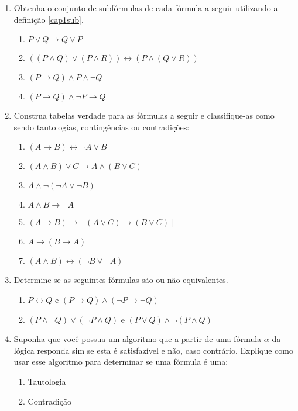 \begin{enumerate}
        \item Obtenha o conjunto de subf\'ormulas de cada f\'ormula a
          seguir utilizando a defini\c{c}\~ao \ref{cap1sub}.
        \begin{enumerate}
           \item $P\lor Q \rightarrow Q \lor P$
           \item $((P\land Q)\lor (P\land R))\leftrightarrow(P\land (Q\lor R))$
           \item $(P\rightarrow Q) \land P\land \neg Q$
           \item $(P \rightarrow Q)\land \neg P \rightarrow Q$
        \end{enumerate}
	\item Construa tabelas verdade para as f\'ormulas a seguir e
          classifique-as como sendo tautologias, conting\^encias ou contradi\c{c}\~oes:
	\begin{enumerate}
		\item $(A\rightarrow B)\leftrightarrow\neg A\lor B$
		\item $(A\land B)\lor C\rightarrow A\land(B\lor C)$
		\item $A\land\neg (\neg A\lor \neg B)$
		\item $A\land B\rightarrow\neg A$
		\item $(A\rightarrow B)\rightarrow[(A\lor C)\rightarrow (B\lor C)]$
		\item $A\rightarrow(B\rightarrow A)$
		\item $(A\land B)\leftrightarrow(\neg B\lor \neg A)$
	\end{enumerate}
        \item Determine se as seguintes f\'ormulas s\~ao ou n\~ao
          equivalentes.
         \begin{enumerate}
		\item $P\leftrightarrow Q$ e $(P\rightarrow Q)\land(\neg P\rightarrow \neg Q)$
		\item $(P\land\neg Q)\lor (\neg P\land Q)$ e $(P\lor Q)\land\neg(P\land Q)$
          \end{enumerate}
          \item Suponha que voc\^e possua um algoritmo que a partir de
            uma f\'ormula $\alpha$ da l\'ogica responda sim se esta
            \'e satisfaz\'ivel e não, caso contr\'ario. Explique
            como usar esse algoritmo para determinar se uma f\'ormula
            \'e uma:
            \begin{enumerate}
              \item Tautologia
              \item Contradi\c{c}\~ao
             \end{enumerate}
\end{enumerate}


